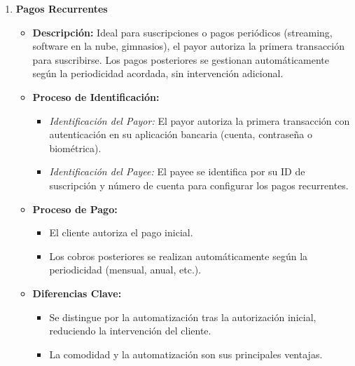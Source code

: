 \begin{enumerate}
    \item \textbf{Pagos Recurrentes}
    \begin{itemize}
        \item \textbf{Descripción:} Ideal para suscripciones o pagos periódicos (streaming, software en la nube, gimnasios), el payor autoriza la primera transacción para suscribirse. Los pagos posteriores se gestionan automáticamente según la periodicidad acordada, sin intervención adicional.
        \item \textbf{Proceso de Identificación:}
        \begin{itemize}
            \item \textit{Identificación del Payor:} El payor autoriza la primera transacción con autenticación en su aplicación bancaria (cuenta, contraseña o biométrica).
            \item \textit{Identificación del Payee:} El payee se identifica por su ID de suscripción y número de cuenta para configurar los pagos recurrentes.
        \end{itemize}
        \item \textbf{Proceso de Pago:}
        \begin{itemize}
            \item El cliente autoriza el pago inicial.
            \item Los cobros posteriores se realizan automáticamente según la periodicidad (mensual, anual, etc.).
        \end{itemize}
        \item \textbf{Diferencias Clave:}
        \begin{itemize}
            \item Se distingue por la automatización tras la autorización inicial, reduciendo la intervención del cliente.
            \item La comodidad y la automatización son sus principales ventajas.
        \end{itemize}
    \end{itemize}


\end{enumerate}
